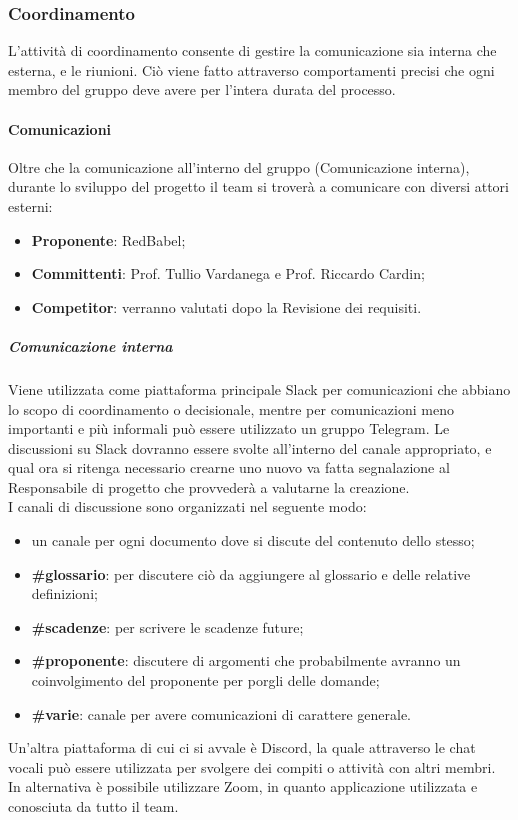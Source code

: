 \subsubsection{Coordinamento} \label{_gestioneDiProcesso_coordinamento}
L'attività di coordinamento consente di gestire la comunicazione sia interna che esterna, e le riunioni. Ciò viene fatto attraverso comportamenti precisi che ogni membro del gruppo deve avere per l'intera durata del processo.

\paragraph{Comunicazioni}
Oltre che la comunicazione all'interno del gruppo (Comunicazione interna), durante lo sviluppo del progetto il team si troverà a comunicare con diversi attori esterni:
\begin{itemize}
    \item \textbf{Proponente}: RedBabel;
    \item \textbf{Committenti}: Prof. Tullio Vardanega e Prof. Riccardo Cardin;
    \item \textbf{Competitor}: verranno valutati dopo la Revisione dei requisiti.
\end{itemize}

\subparagraph{Comunicazione interna}
Viene utilizzata come piattaforma principale Slack per comunicazioni che abbiano lo scopo di coordinamento o decisionale, mentre per comunicazioni meno importanti e più informali può essere utilizzato un gruppo Telegram.
Le discussioni su Slack dovranno essere svolte all'interno del canale appropriato, e qual ora si ritenga necessario crearne uno nuovo va fatta segnalazione al Responsabile di progetto che provvederà a valutarne la creazione.\\
I canali di discussione sono organizzati nel seguente modo:
\begin{itemize}
    \item un canale per ogni documento dove si discute del contenuto dello stesso;
    \item \textbf{\#glossario}: per discutere ciò da aggiungere al glossario e delle relative definizioni;
    \item \textbf{\#scadenze}: per scrivere le scadenze future;
    \item \textbf{\#proponente}: discutere di argomenti che probabilmente avranno un coinvolgimento del proponente per porgli delle domande;
    \item \textbf{\#varie}: canale per avere comunicazioni di carattere generale.
\end{itemize}
Un'altra piattaforma di cui ci si avvale è Discord, la quale attraverso le chat vocali può essere utilizzata per svolgere dei compiti o attività con altri membri. In alternativa è possibile utilizzare Zoom, in quanto applicazione utilizzata e conosciuta da tutto il team.


